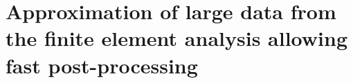 \chapter{Approximation of large data from the finite element analysis allowing fast post-processing}
\label{appendix-approximation}
